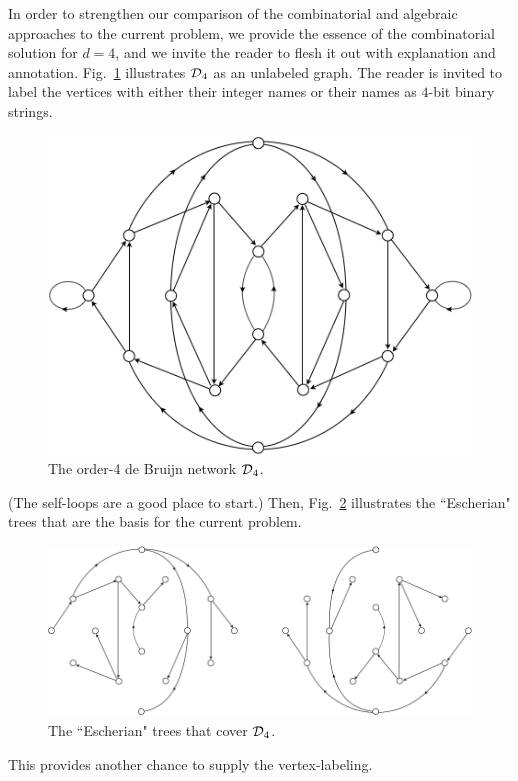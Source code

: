 \begin{itemize}
In order to strengthen our comparison of the combinatorial and algebraic approaches to the current problem, we provide the essence of the combinatorial solution for $d=4$, and we invite the reader to flesh it out with explanation and annotation.  Fig.~\ref{fig:DeBruijn4base} illustrates
$\mbox{$\cal D$}_4$ as an unlabeled graph.  The reader is invited to label the vertices with either their integer names or their names as $4$-bit binary strings.
\begin{figure}[ht]
\begin{center}
        \includegraphics[scale=0.45]{FiguresGraph/deBruijn4Base}
        \caption{The order-4 de Bruijn network $\mbox{$\cal D$}_4$.}
        \label{fig:DeBruijn4base}
\end{center}
\end{figure}
(The self-loops are a good place to start.)  Then, Fig.~\ref{fig:DeBruijn4tree} illustrates the  
``Escherian" trees that are the basis for the current problem.
\begin{figure}[ht]
\begin{center}
        \includegraphics[scale=0.35]{FiguresGraph/deBruijn4Tree}
        \caption{The ``Escherian" trees that cover $\mbox{$\cal D$}_4$.}
        \label{fig:DeBruijn4tree}
\end{center}
\end{figure}
This provides another chance to supply the vertex-labeling.


\end{itemize}
